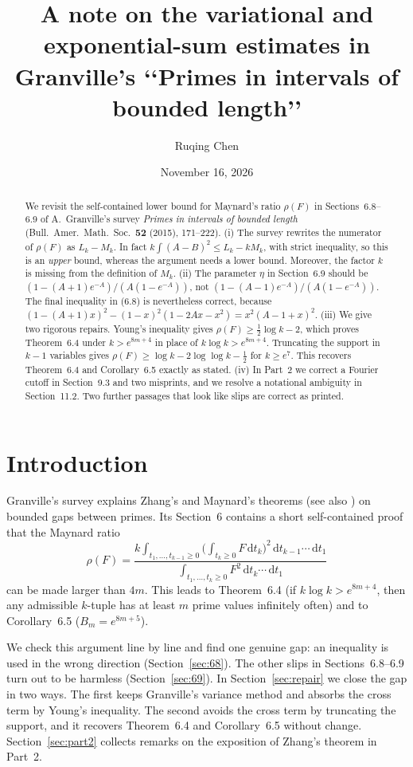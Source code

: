 \documentclass[11pt,a4paper]{amsart}
\title[Variational and exponential-sum estimates in Granville's survey]{A note on the variational and exponential-sum estimates in Granville's \texorpdfstring{\lq\lq Primes in intervals of bounded length\rq\rq}{"Primes in intervals of bounded length"}}
\author{Ruqing Chen}
\date{November 16, 2026}
\theoremstyle{remark}
\newcommand{\dd}{\,\mathrm{d}}
\begin{document}
\begin{abstract}
We revisit the self-contained lower bound for Maynard's ratio $\rho(F)$ in Sections~6.8--6.9 of
A.~Granville's survey \emph{Primes in intervals of bounded length} (Bull.\ Amer.\ Math.\ Soc.\ \textbf{52}
(2015), 171--222). (i) The survey rewrites the numerator of $\rho(F)$ as $L_k-M_k$. In fact
$k\int(A-B)^2\le L_k-kM_k$, with strict inequality, so this is an \emph{upper} bound, whereas the
argument needs a lower bound. Moreover, the factor $k$ is missing from the definition of $M_k$.
(ii) The parameter $\eta$ in Section~6.9 should be $(1-(A+1)e^{-A})/(A(1-e^{-A}))$, not
$(1-(A-1)e^{-A})/(A(1-e^{-A}))$. The final inequality in (6.8) is nevertheless correct, because
$(1-(A+1)x)^2-(1-x)^2(1-2Ax-x^2)=x^2(A-1+x)^2$. (iii) We give two rigorous repairs. Young's inequality
gives $\rho(F)\ge\frac12\log k-2$, which proves Theorem~6.4 under $k>e^{8m+4}$ in place of
$k\log k>e^{8m+4}$. Truncating the support in $k-1$ variables gives
$\rho(F)\ge\log k-2\log\log k-\frac12$ for $k\ge e^{7}$. This recovers Theorem~6.4 and Corollary~6.5
exactly as stated. (iv) In Part~2 we correct a Fourier cutoff in Section~9.3 and two misprints, and we
resolve a notational ambiguity in Section~11.2. Two further passages that look like slips are correct as
printed.
\end{abstract}
\maketitle

\section{Introduction}

Granville's survey \cite{G} explains Zhang's \cite{Z} and Maynard's \cite{M} theorems (see also \cite{P}) on bounded gaps
between primes. Its Section~6 contains a short self-contained proof that the Maynard ratio
\[
\rho(F)=\frac{k\int_{t_1,\dots,t_{k-1}\ge0}\bigl(\int_{t_k\ge0}F\dd t_k\bigr)^2\dd t_{k-1}\cdots\dd t_1}
{\int_{t_1,\dots,t_k\ge0}F^2\dd t_k\cdots\dd t_1}
\]
can be made larger than $4m$. This leads to Theorem~6.4 (if $k\log k>e^{8m+4}$, then any admissible
$k$-tuple has at least $m$ prime values infinitely often) and to Corollary~6.5 ($B_m=e^{8m+5}$).

We check this argument line by line and find one genuine gap: an inequality is used in the wrong
direction (Section~\ref{sec:68}). The other slips in Sections~6.8--6.9 turn out to be harmless
(Section~\ref{sec:69}). In Section~\ref{sec:repair} we close the gap in two ways. The first keeps
Granville's variance method and absorbs the cross term by Young's inequality. The second avoids the cross
term by truncating the support, and it recovers Theorem~6.4 and Corollary~6.5 without change.
Section~\ref{sec:part2} collects remarks on the exposition of Zhang's theorem in Part~2.
\end{document}
